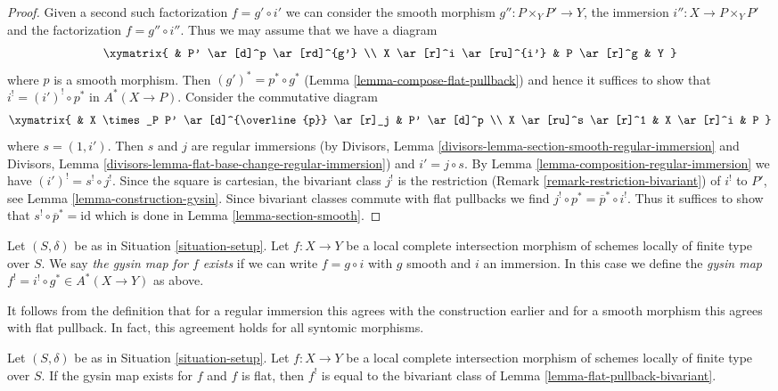\begin{proof}
Given a second such factorization $f = g' \circ i'$ we can
consider the smooth morphism $g'' : P \times_Y P' \to Y$, the
immersion $i'' : X \to P \times_Y P'$ and the factorization
$f = g'' \circ i''$. Thus we may assume that we have a diagram
$$
\xymatrix{
& P' \ar[d]^p \ar[rd]^{g'} \\
X \ar[r]^i \ar[ru]^{i'} & P \ar[r]^g & Y
}
$$
where $p$ is a smooth morphism. Then $(g')^* = p^* \circ g^*$
(Lemma \ref{lemma-compose-flat-pullback}) and hence it suffices
to show that $i^! = (i')^! \circ p^*$
in $A^*(X \to P)$. Consider the commutative diagram
$$
\xymatrix{
& X \times_P P' \ar[d]^{\overline{p}} \ar[r]_j & P' \ar[d]^p \\
X \ar[ru]^s \ar[r]^1 & X \ar[r]^i & P
}
$$
where $s =(1, i')$. Then $s$ and $j$ are regular immersions
(by Divisors, Lemma \ref{divisors-lemma-section-smooth-regular-immersion}
and Divisors, Lemma \ref{divisors-lemma-flat-base-change-regular-immersion})
and $i' = j \circ s$. By Lemma \ref{lemma-composition-regular-immersion}
we have $(i')^! = s^! \circ j^!$.
Since the square is cartesian, the bivariant class $j^!$
is the restriction (Remark \ref{remark-restriction-bivariant})
of $i^!$ to $P'$, see Lemma \ref{lemma-construction-gysin}.
Since bivariant classes commute with flat pullbacks
we find $j^! \circ p^* = \overline{p}^* \circ i^!$.
Thus it suffices to show that $s^! \circ \overline{p}^* = \text{id}$
which is done in Lemma \ref{lemma-section-smooth}.
\end{proof}

\begin{definition}
\label{definition-lci-gysin}
Let $(S, \delta)$ be as in Situation \ref{situation-setup}.
Let $f : X \to Y$ be a local complete intersection morphism
of schemes locally of finite type over $S$. We say
{\it the gysin map for $f$ exists} if we can write
$f = g \circ i$ with $g$ smooth and $i$ an immersion.
In this case we define the
{\it gysin map} $f^! = i^! \circ g^* \in A^*(X \to Y)$ as above.
\end{definition}

\noindent
It follows from the definition that for a regular immersion
this agrees with the construction earlier and for a smooth
morphism this agrees with flat pullback. In fact, this agreement
holds for all syntomic morphisms.

\begin{lemma}
\label{lemma-lci-gysin-flat}
Let $(S, \delta)$ be as in Situation \ref{situation-setup}.
Let $f : X \to Y$ be a local complete intersection morphism
of schemes locally of finite type over $S$. If the gysin map
exists for $f$ and $f$ is flat, then $f^!$ is equal to the
bivariant class of Lemma \ref{lemma-flat-pullback-bivariant}.
\end{lemma}

